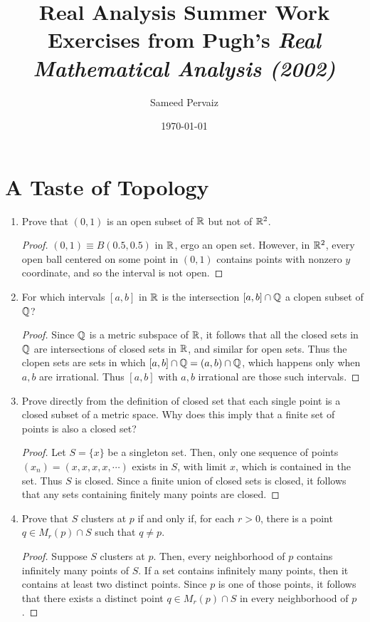 \documentclass[11pt, a4paper, latinreim, shortsets]{notes}
\title{Real Analysis Summer Work \\
\large Exercises from Pugh's \emph{Real Mathematical Analysis (2002)}}
\author{Sameed Pervaiz}
\date{\today}
\begin{document}
\maketitle

\setcounter{chapter}{1}
\chapter{A Taste of Topology}
\begin{enumerate}[label={\bfseries 2.\arabic*}]
	\item Prove that $(0,1)$ is an open subset of $\mathbb{R}$ but not of $\mathbb{R}^2$.
	\begin{proof}
		$(0,1) \equiv B(0.5, 0.5)$ in $\mathbb{R}$, ergo an open set. However, in $\mathbb{R}^2$,
		every open ball centered on some point in $(0,1)$ contains points with nonzero $y$
		coordinate, and so the interval is not open.
	\end{proof}

	\item For which intervals $[a,b]$ in $\mathbb{R}$ is the intersection $[a,b] \cap \mathbb{Q}$ a clopen subset
	of $\mathbb{Q}$?
	\begin{proof}
		Since $\mathbb{Q}$ is a metric subspace of $\mathbb{R}$, it follows that all the closed sets in $\mathbb{Q}$
		are intersections of closed sets in $\mathbb{R}$, and similar for open sets. Thus the clopen sets are
		sets in which $[a,b] \cap \mathbb{Q} = (a,b) \cap \mathbb{Q}$, which happens only when $a,b$ are irrational.
		Thus $[a,b]$ with $a,b$ irrational are those such intervals.
	\end{proof}

	\item Prove directly from the definition of closed set that each single point is a closed
	subset of a metric space. Why does this imply that a finite set of points is also a closed set?
	\begin{proof}
		Let $S=\{x\}$ be a singleton set. Then, only one sequence of points $(x_n)=(x,x,x,x,\cdots)$
		exists in $S$, with limit $x$, which is contained in the set. Thus $S$ is closed. Since a
		finite union of closed sets is closed, it follows that any sets containing finitely many
		points are closed.
	\end{proof}

	\item Prove that $S$ clusters at $p$ if and only if, for each $r > 0$, there is a point
	$q \in M_{r}(p) \cap S$ such that $q \neq p$.
	\begin{proof}
	Suppose $S$ clusters at $p$. Then, every neighborhood of $p$ contains infinitely many points of $S$.
	If a set contains infinitely many points, then it contains at least two distinct points. Since $p$
	is one of those points, it follows that there exists a distinct point $q\in M_r(p)\cap S$ in every
	neighborhood of $p$.


\end{proof}
\end{enumerate}
\end{document}

